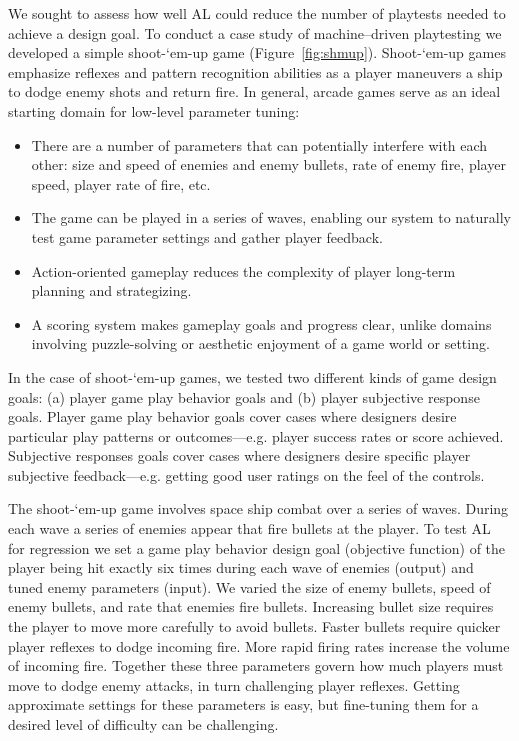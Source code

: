 \documentclass{sig-alternate}
\begin{document}
We sought to assess how well AL could reduce the number of playtests needed to achieve a design goal.
To conduct a case study of machine--driven playtesting we developed a simple shoot-`em-up game (Figure~\ref{fig:shmup}).
Shoot-`em-up games emphasize reflexes and pattern recognition abilities as a player maneuvers a ship to dodge enemy shots and return fire.
%
In general, arcade games serve as an ideal starting domain for low-level parameter tuning:
\begin{itemize}
\item There are a number of parameters that can potentially interfere with each other: size and speed of enemies and enemy bullets, rate of enemy fire, player speed, player rate of fire, etc.
\item The game can be played in a series of waves, enabling our system to naturally test game parameter settings and gather player feedback.
\item Action-oriented gameplay reduces the complexity of player long-term planning and strategizing.
\item A scoring system makes gameplay goals and progress clear, unlike domains involving puzzle-solving or aesthetic enjoyment of a game world or setting.
\end{itemize}
%
In the case of shoot-`em-up games, we tested two different kinds of game design goals: (a) player game play behavior goals and (b) player subjective response goals.
Player game play behavior goals cover cases where designers desire particular play patterns or outcomes---e.g. player success rates or score achieved. 
Subjective responses goals cover cases where designers desire specific player subjective feedback---e.g. getting good user ratings on the feel of the controls.


The shoot-`em-up game involves space ship combat over a series of waves.
During each wave a series of enemies appear that fire bullets at the player. 
To test AL for regression we set a game play behavior design goal (objective function) of the player being hit exactly six times during each wave of enemies (output) and tuned enemy parameters (input).
We varied the size of enemy bullets, speed of enemy bullets, and rate that enemies fire bullets. 
Increasing bullet size requires the player to move more carefully to avoid bullets. 
Faster bullets require quicker player reflexes to dodge incoming fire. 
More rapid firing rates increase the volume of incoming fire. 
Together these three parameters govern how much players must move to dodge enemy attacks, in turn challenging player reflexes. 
Getting approximate settings for these parameters is easy, but fine-tuning them for a desired level of difficulty can be challenging. 
\end{document}
